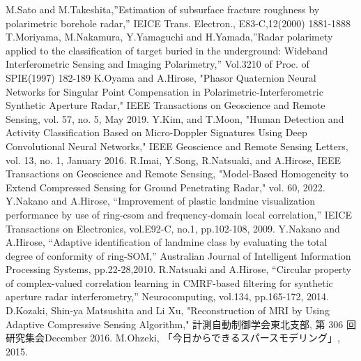 \documentclass[12pt,a4paper]{jsreport}
\begin{document}
\clearpage

\begin{thebibliography}{99}
    M.Sato and M.Takeshita,”Estimation of subsurface fracture roughness by
    polarimetric borehole radar,” IEICE Trans. Electron., E83-C,12(2000) 1881-1888
    T.Moriyama, M.Nakamura, Y.Yamaguchi and H.Yamada,”Radar polarimety applied
    to the classification of target buried in the underground: Wideband Interferometric
    Sensing and Imaging Polarimetry,” Vol.3210 of Proc. of SPIE(1997) 182-189
     K.Oyama and A.Hirose, "Phasor Quaternion Neural Networks for Singular
     Point Compensation in Polarimetric-Interferometric
     Synthetic Aperture Radar," IEEE Transactions on Geoscience and Remote Sensing, vol. 57, no. 5, May 2019.
     Y.Kim, and T.Moon, "Human Detection and Activity Classification Based
     on Micro-Doppler Signatures Using Deep
     Convolutional Neural Networks," IEEE Geoscience and Remote Sensing Letters, vol. 13, no. 1, January 2016.
     R.Imai, Y.Song, R.Natsuaki, and A.Hirose, IEEE Transactions on Geoscience and Remote Sensing,
     "Model-Based Homogeneity to Extend Compressed Sensing for Ground Penetrating Radar," vol. 60, 2022.
     Y.Nakano and A.Hirose, “Improvement of plastic landmine visualization performance by use of ring-csom and frequency-domain local
     correlation,” IEICE Transactions on Electronics, vol.E92-C, no.1,
     pp.102-108, 2009.
     Y.Nakano and A.Hirose, “Adaptive identification of landmine class
     by evaluating the total degree of conformity of ring-SOM,” Australian
     Journal of Intelligent Information Processing Systems, pp.22-28,2010. %
    R.Natsuaki and A.Hirose, “Circular property of complex-valued
    correlation learning in CMRF-based filtering for synthetic aperture
    radar interferometry,” Neurocomputing, vol.134, pp.165-172, 2014.
    D.Kozaki, Shin-ya Matsushita and Li Xu, "Reconstruction of MRI by Using Adaptive Compressive Sensing
    Algorithm," 計測自動制御学会東北支部, 第 306 回研究集会December 2016.
    M.Ohzeki, 「今日からできるスパースモデリング」, 2015. 
   
    
     
   

\end{thebibliography}
\end{document}
